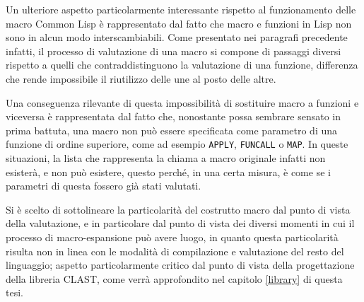 Un ulteriore aspetto particolarmente interessante rispetto al funzionamento
delle macro Common Lisp è rappresentato dal fatto che macro e funzioni in Lisp
non sono in alcun modo interscambiabili. Come presentato nei paragrafi
precedente infatti, il processo di valutazione di una macro si compone di
passaggi diversi rispetto a quelli che contraddistinguono la valutazione di una
funzione, differenza che rende impossibile il riutilizzo delle une al posto
delle altre.

Una conseguenza rilevante di questa impossibilità di sostituire macro a funzioni
e viceversa è rappresentata dal fatto che, nonostante possa sembrare sensato in
prima battuta, una macro non può essere specificata come parametro di una
funzione di ordine superiore, come ad esempio \texttt{APPLY}, \texttt{FUNCALL} o
\texttt{MAP}. In queste situazioni, la lista che rappresenta la chiama a macro
originale infatti non esisterà, e non può esistere, questo perché, in una certa
misura, è come se i parametri di questa fossero già stati valutati.

Si è scelto di sottolineare la particolarità del costrutto macro dal punto di
vista della valutazione, e in particolare dal punto di vista dei diversi momenti
in cui il processo di macro-espansione può avere luogo, in quanto questa
particolarità risulta non in linea con le modalità di compilazione e valutazione
del resto del linguaggio; aspetto particolarmente critico dal punto di vista
della progettazione della libreria CLAST, come verrà approfondito nel capitolo
\ref{library} di questa tesi.
